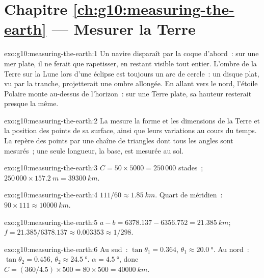 \section*{Chapitre \ref{ch:g10:measuring-the-earth} --- Mesurer la Terre}

\begin{solution}{exo:g10:measuring-the-earth:1}
Un navire disparaît par la coque d'abord~: sur une mer plate, il ne ferait
que rapetisser, en restant visible tout entier. L'ombre de la Terre sur la
Lune lors d'une éclipse est toujours un arc de cercle~: un disque plat, vu
par la tranche, projetterait une ombre allongée. En allant vers le nord,
l'étoile Polaire monte au-dessus de l'horizon~: sur une Terre plate, sa
hauteur resterait presque la même.
\end{solution}

\begin{solution}{exo:g10:measuring-the-earth:2}
La  mesure la forme et les dimensions de la Terre et la position
des points de sa surface, ainsi que leurs variations au cours du temps. La
 repère des points par une chaîne de triangles dont tous les
angles sont mesurés~; une seule longueur, la base, est mesurée au sol.
\end{solution}

\begin{solution}{exo:g10:measuring-the-earth:3}
$C = 50 \times 5000 = 250\,000$ stades~; $250\,000 \times \qty{157.2}{m} =
\qty{39300}{km}$.
\end{solution}

\begin{solution}{exo:g10:measuring-the-earth:4}
$111/60 \approx \qty{1.85}{km}$. Quart de méridien~: $90 \times 111 \approx
\qty{10000}{km}$.
\end{solution}

\begin{solution}{exo:g10:measuring-the-earth:5}
$a - b = 6378.137 - 6356.752 = \qty{21.385}{km}$;
$f = 21.385/6378.137 \approx 0.003353 \approx 1/298$.
\end{solution}

\begin{solution}{exo:g10:measuring-the-earth:6}
Au sud~: $\tan\theta_1 = 0.364$, $\theta_1 \approx \qty{20.0}{\degree}$. Au
nord~: $\tan\theta_2 = 0.456$, $\theta_2 \approx \qty{24.5}{\degree}$.
$\alpha = \qty{4.5}{\degree}$, donc $C = (360/4.5) \times 500 = 80 \times 500 =
\qty{40000}{km}$.
\end{solution}

